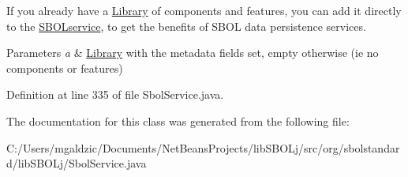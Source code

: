 If you already have a \hyperlink{classorg_1_1sbolstandard_1_1lib_s_b_o_lj_1_1_library}{Library} of components and features, you can add it directly to the \hyperlink{classorg_1_1sbolstandard_1_1lib_s_b_o_lj_1_1_s_b_o_lservice}{SBOLservice}, to get the benefits of SBOL data persistence services.


\begin{DoxyParams}{Parameters}
{\em a} & \hyperlink{classorg_1_1sbolstandard_1_1lib_s_b_o_lj_1_1_library}{Library} with the metadata fields set, empty otherwise (ie no components or features) \\
\hline
\end{DoxyParams}


Definition at line 335 of file SbolService.java.



The documentation for this class was generated from the following file:\begin{DoxyCompactItemize}
\item 
C:/Users/mgaldzic/Documents/NetBeansProjects/libSBOLj/src/org/sbolstandard/libSBOLj/SbolService.java\end{DoxyCompactItemize}
